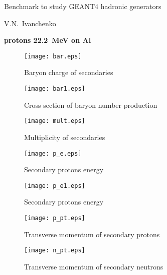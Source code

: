 \documentclass[12pt]{article}
\begin{document}
\pagestyle{empty}

\begin{center}
{\large Benchmark to study GEANT4 hadronic generators} 

\vspace*{5mm}
V.N.~Ivanchenko

\vspace*{5mm}


\vspace*{5mm}

{\bf protons 22.2~MeV on Al} 

\vspace*{5mm}


\end{center}


\begin{figure}[htbp]
\caption{Baryon charge of secondaries}
\label{fig1}  
\centerline{\texttt{[image: bar.eps]}}
\end{figure}

\begin{figure}[htbp]
\caption{Cross section of baryon number production}
\label{fig1b}  
\centerline{\texttt{[image: bar1.eps]}}
\end{figure}

\begin{figure}[htbp]
\caption{Multiplicity of secondaries}
\label{fig1a}  
\centerline{\texttt{[image: mult.eps]}}
\end{figure}
\begin{figure}[htbp]
\caption{Secondary protons energy}
\label{fig2} 
\centerline{\texttt{[image: p\_e.eps]}}
\end{figure}
\begin{figure}[htbp]
\caption{Secondary protons energy}
\label{fig2a} 
\centerline{\texttt{[image: p\_e1.eps]}}
\end{figure}

\newpage

\begin{figure}[htbp]
\caption{Transverse momentum of secondary protons} 
\label{fig3}
\centerline{\texttt{[image: p\_pt.eps]}}
\end{figure}

\newpage

\begin{figure}[htbp]
\caption{Transverse momentum of secondary neutrons} 
\label{fig4}
\centerline{\texttt{[image: n\_pt.eps]}}
\end{figure}
\end{document}
